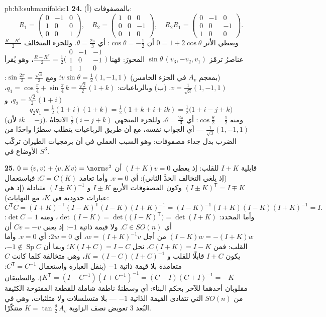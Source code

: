 \begin{solution}{pb:b3:submanifolds:1}
\textbf{24.} (أ) بالمصفوفات:
\[
R_1 = \begin{pmatrix} 0 & -1 & 0\\ 1 & 0 & 0\\ 0 & 0 & 1
\end{pmatrix},
\quad
R_2 = \begin{pmatrix} 1 & 0 & 0\\ 0 & 0 & -1\\ 0 & 1 & 0
\end{pmatrix},
\quad
R_2R_1 = \begin{pmatrix} 0 & -1 & 0\\ 0 & 0 & -1\\ 1 & 0 &
0\end{pmatrix}.
\]
ويعطي الأثر $0 = 1 + 2\cos\theta$ أن $\cos\theta = -\frac12$: أي $\theta = \frac{2\pi}3$. وللجزء المتخالف
$\frac{R -
R^{\mathsf T}}2$ عناصرُ ترمّز $\sin\theta\,(v_3,
-v_2, v_1)$ المحورَ: فهنا $\frac{R - R^{\mathsf T}}2 =
\frac12\bigl(\begin{smallmatrix}0 & -1 & -1\\ 1 & 0 & -1\\ 1
& 1 & 0\end{smallmatrix}\bigr)$، وهو يُقرأ
(بمعجم $A_v$ في الجزء الخامس) $v\sin\theta = \frac12(1, -1, 1)$؛ ومع $\sin\frac{2\pi}3 = \frac{\sqrt3}2$: $v = \frac1{\sqrt3}(1,
-1, 1)$.
(ب) وبالرباعيات: $q_1 = \cos\frac\pi4 + \sin\frac\pi4\,k =
\frac{\sqrt2}2(1 + k)$، $q_2 = \frac{\sqrt2}2(1 + i)$، و
\[
q_2q_1 = \tfrac12(1 + i)(1 + k) = \tfrac12(1 + k + i + ik)
= \tfrac12\bigl(1 + i - j + k\bigr)
\]
(لأن $ik = -j$). ومنه $\cos\frac\theta2 = \frac12$: أي $\theta =
\frac{2\pi}3$، وللجزء المتجهي
$\frac12(i - j + k)$ الاتجاهُ $\frac1{\sqrt3}(1, -1, 1)$ --- أي الجواب نفسه، مع أن طريق
الرباعيات يتطلب سطرًا واحدًا من الضرب بدل جداء مصفوفات: وهو
السبب العملي في أن برمجيات الطيران تركّب الأوضاع في $S^3$.

\textbf{25.} قابلية $I + K$ للقلب: إذ يعطي $(I + K)v = 0$ أن
$0 =
\langle v, v\rangle + \langle v, Kv\rangle = \norm v^2$ (إذ يلغي التخالف الحدَّ الثاني): أي $v = 0$. وأما تعامد
$C = C(K)$: فباستعمال $(I \pm K)^{\mathsf T} = I \mp K$ وكون المصفوفات الأربع $I \pm K$
و $(I \pm K)^{-1}$ متبادلة (إذ هي عبارات حدودية في $K$، مع
النهايات):
\[
C^{\mathsf T}C = (I + K)^{-\mathsf T}(I - K)^{\mathsf T}
(I - K)(I + K)^{-1}
= (I - K)^{-1}(I + K)(I - K)(I + K)^{-1} = I .
\]
وأما المحدد: $\det(I - K) = \det\bigl((I - K)^{\mathsf
T}\bigr) = \det(I + K)$، ومنه $\det C = 1$: أي $C \in SO(n)$.
ولا قيمة ذاتية $-1$: إذ يعني $Cv = -v$ أن $(I - K)w = -(I + K)w$ من أجل $w = (I + K)^{-1}v$،
أي $2w = 0$: أي $v = 0$. وأما القلب: فمن $C(I + K) = I - K$، نحل $K(I + C) = I -
C$؛
وبما أن $-1 \notin \operatorname{Sp}C$، يكون $I + C$ قابلًا للقلب و $K = (I - C)(I + C)^{-1}$، وهي
متخالفة كلما كانت $C$ متعامدة بلا قيمة ذاتية $-1$ (بنقل العبارة
واستعمال $C^{\mathsf T} =
C^{-1}$: $K^{\mathsf T} = (I - C^{-1})(I + C^{-1})^{-1} =
(C - I)(C + I)^{-1} = -K$). والتطبيقان مقلوبان أحدهما للآخر
بحكم البناء: أي وسطنةٌ ناطقة شاملة للقطعة المفتوحة الكثيفة من
$SO(n)$ التي تتفادى القيمة الذاتية $-1$ --- بلا متسلسلات ولا
مثلثيات، وهي في البُعد $3$ تعويض نصف الزاوية $K = \tan\frac\theta2\,A_v$ متنكّرًا.
\end{solution}

